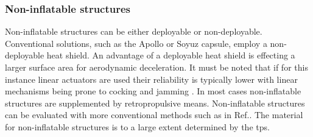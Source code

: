 \subsubsection{Non-inflatable structures}
Non-inflatable structures can be either deployable or non-deployable. Conventional solutions, such as the Apollo or Soyuz capsule, employ a non-deployable heat shield. An advantage of a deployable heat shield is effecting a larger surface area for aerodynamic deceleration. It must be noted that if for this instance linear actuators are used their reliability is typically lower with linear mechanisms being prone to cocking and jamming \cite[p.683]{Wertz2011}. In most cases non-inflatable structures are supplemented by retropropulsive means. Non-inflatable structures can be evaluated with more conventional methods such as in Ref.\cite{Megson2012}. The material for non-inflatable structures is to a large extent determined by the \gls{tps}. 











